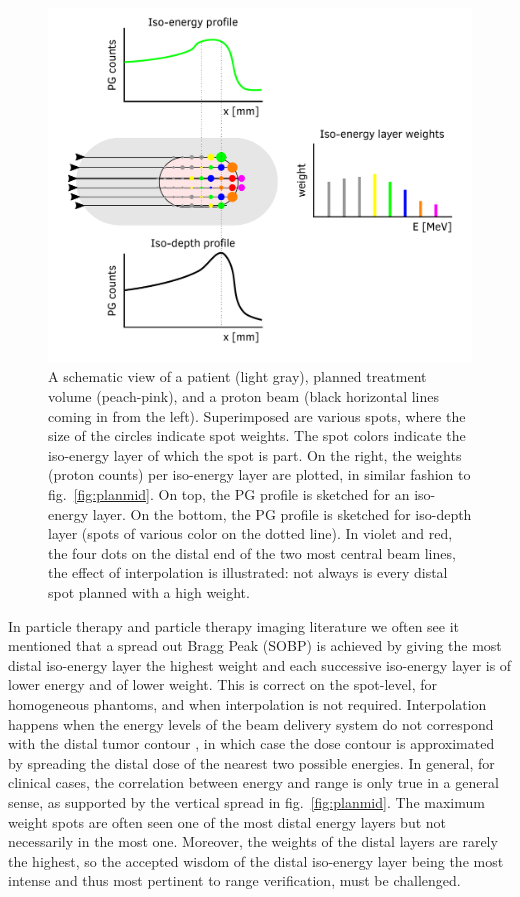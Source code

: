 \documentclass[a4paper,english]{article}
\begin{document}
\begin{figure}[htp]
  \centering
  \includegraphics[width=0.6\linewidth]{planning}
  \caption{A schematic view of a patient (light gray), planned treatment volume (peach-pink), and a proton beam (black horizontal lines coming in from the left). Superimposed are various spots, where the size of the circles indicate spot weights. The spot colors indicate the iso-energy layer of which the spot is part. On the right, the weights (proton counts) per iso-energy layer are plotted, in similar fashion to fig.~\ref{fig:planmid}. On top, the PG profile is sketched for an iso-energy layer. On the bottom, the PG profile is sketched for iso-depth layer (spots of various color on the dotted line). In violet and red, the four dots on the distal end of the two most central beam lines, the effect of interpolation is illustrated: not always is every distal spot planned with a high weight.}
  \label{fig:planning}
\end{figure}

In particle therapy and particle therapy imaging literature we often see it mentioned that a spread out Bragg Peak (SOBP) is achieved by giving the most distal iso-energy layer the highest weight and each successive iso-energy layer is of lower energy and of lower weight. This is correct on the spot-level, for homogeneous phantoms, and when interpolation is not required. Interpolation happens when the energy levels of the beam delivery system do not correspond with the distal tumor contour \citep{0031-9155-57-21-N405}, in which case the dose contour is approximated by spreading the distal dose of the nearest two possible energies. In general, for clinical cases, the correlation between energy and range is only true in a general sense, as supported by the vertical spread in fig.~\ref{fig:planmid}. The maximum weight spots are often seen one of the most distal energy layers but not necessarily in the most one. Moreover, the weights of the distal layers are rarely the highest, so the accepted wisdom of the distal iso-energy layer being the most intense and thus most pertinent to range verification, must be challenged.
\end{document}
